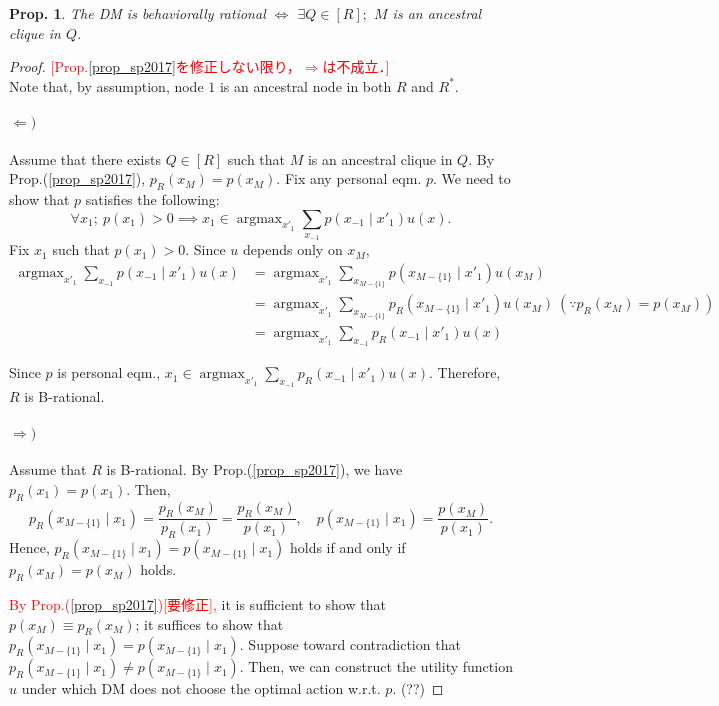 \documentclass[11pt,a4paper,dvipdfmx]{article}
\theoremstyle{plain}
\newtheorem{prop}{Prop.}[section]
\newcommand{\equi}{\Longleftrightarrow}
\DeclareMathOperator*{\argmax}{argmax}
\newcommand{\ocomment}[1]{{\textcolor{red}{#1}}}
\begin{document}
\newpage
\begin{screen}
\begin{prop}
The DM is behaviorally rational $\equi$ $\exists Q \in [R];$ $M$ is an ancestral clique in $Q$.
\end{prop}
\end{screen}


\begin{proof}
	\ocomment{[Prop.\ref{prop_sp2017}を修正しない限り，$\Rightarrow$は不成立．]} \\
	Note that, by assumption, node $1$ is an ancestral node in both $R$ and $R^*$.
	
	\paragraph{$\Leftarrow)$}
	Assume that there exists $Q \in [R]$ such that $M$ is an ancestral clique in $Q$.
	By Prop.(\ref{prop_sp2017}), $p_R(x_M) = p(x_M)$.
	Fix any personal eqm. $p$. We need to show that $p$ satisfies the following:
	\[
	\forall x_1; \ p(x_1) > 0 \implies x_1 \in \argmax_{x'_1} \sum_{x_{-1}} p(x_{-1} \mid x'_1) u(x).
	\]
	Fix $x_1$ such that $p(x_1) > 0$. Since $u$ depends only on $x_M$,
	\begin{align*}
		\argmax_{x'_1} \sum_{x_{-1}} p(x_{-1} \mid x'_1) u(x)
	&= \argmax_{x'_1} \sum_{x_{M - \{1\}}} p(x_{M - \{1\}} \mid x'_1) u(x_M) \\
	&= \argmax_{x'_1} \sum_{x_{M - \{1\}}} p_R(x_{M - \{1\}} \mid x'_1) u(x_M) \ (\because p_R(x_M) = p(x_M)) \\
	&= \argmax_{x'_1} \sum_{x_{-1}} p_R(x_{-1} \mid x'_1) u(x)
	\end{align*}
	
	Since $p$ is personal eqm., $x_1 \in \argmax_{x'_1} \sum_{x_{-1}} p_R(x_{-1} \mid x'_1) u(x)$. 
	Therefore, $R$ is B-rational.
	
	\paragraph{$\Rightarrow)$}
	Assume that $R$ is B-rational.
	By Prop.(\ref{prop_sp2017}), we have $p_R(x_1) = p(x_1)$. Then,
	\[
	p_R(x_{M - \{1\}} \mid x_1) = \frac{p_R(x_M)}{p_R(x_1)} = \frac{p_R(x_M)}{p(x_1)}, \quad
	p(x_{M - \{1\}} \mid x_1) = \frac{p(x_M)}{p(x_1)}.
	\]
	Hence, 
	$
	p_R(x_{M - \{1\}} \mid x_1) = p(x_{M - \{1\}} \mid x_1)
	$ holds
	if and only if $p_R(x_M) = p(x_M)$ holds.
	
	\ocomment{By Prop.(\ref{prop_sp2017})[要修正],} it is sufficient to show that $p(x_M) \equiv p_R(x_M)$; it suffices to show that 
	$p_R(x_{M - \{1\}} \mid x_1) = p(x_{M - \{1\}} \mid x_1)$.
	Suppose toward contradiction that $p_R(x_{M - \{1\}} \mid x_1) \neq p(x_{M - \{1\}} \mid x_1)$. Then,
	we can construct the utility function $u$ under which DM does not choose the optimal action w.r.t. $p$. (??)
\end{proof}
\end{document}
